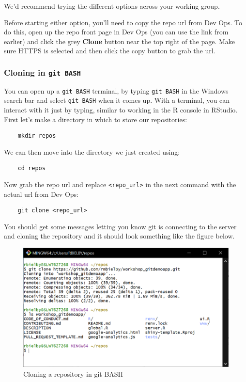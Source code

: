 \documentclass[
  12pt,
]{article}
\begin{document}
We'd recommend trying the different options across your working group.

Before starting either option, you'll need to copy the repo url from Dev
Ops. To do this, open up the repo front page in Dev Ops (you can use the
link from earlier) and click the grey \textbf{Clone} button near the top
right of the page. Make sure HTTPS is selected and then click the copy
button to grab the url.

\hypertarget{cloning-in-git-bash}{%
\subsubsection{\texorpdfstring{Cloning in
\texttt{git\ BASH}}{Cloning in git BASH}}\label{cloning-in-git-bash}}

You can open up a \texttt{git\ BASH} terminal, by typing
\texttt{git\ BASH} in the Windows search bar and select
\texttt{git\ BASH} when it comes up. With a terminal, you can interact
with it just by typing, similar to working in the R console in RStudio.
First let's make a directory in which to store our repositories:

\begin{verbatim}
    mkdir repos
\end{verbatim}

We can then move into the directory we just created using:

\begin{verbatim}
    cd repos
\end{verbatim}

Now grab the repo url and replace
\texttt{\textless{}repo\_url\textgreater{}} in the next command with the
actual url from Dev Ops:

\begin{verbatim}
    git clone <repo_url>
\end{verbatim}

You should get some messages letting you know git is connecting to the
server and cloning the repository and it should look something like the
figure below.

\begin{figure}
\includegraphics[width=0.6\linewidth]{images/gitdemo/gitdemo-terminal_clone} \caption{Cloning a repository in git BASH}\label{fig:unnamed-chunk-3}
\end{figure}
\end{document}
